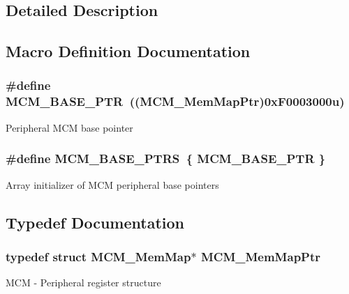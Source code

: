 \subsection{Detailed Description}


\subsection{Macro Definition Documentation}
\hypertarget{group___m_c_m___peripheral_gad41e931f176c230831e3dbad45117841}{}
\subsubsection[{M\+C\+M\+\_\+\+B\+A\+S\+E\+\_\+\+P\+T\+R}]{\setlength{\rightskip}{0pt plus 5cm}\#define M\+C\+M\+\_\+\+B\+A\+S\+E\+\_\+\+P\+T\+R~(({\bf M\+C\+M\+\_\+\+Mem\+Map\+Ptr})0x\+F0003000u)}\label{group___m_c_m___peripheral_gad41e931f176c230831e3dbad45117841}
Peripheral M\+C\+M base pointer \hypertarget{group___m_c_m___peripheral_gae2d5e838ce7d2d4108738c05bf224272}{}
\subsubsection[{M\+C\+M\+\_\+\+B\+A\+S\+E\+\_\+\+P\+T\+R\+S}]{\setlength{\rightskip}{0pt plus 5cm}\#define M\+C\+M\+\_\+\+B\+A\+S\+E\+\_\+\+P\+T\+R\+S~\{ {\bf M\+C\+M\+\_\+\+B\+A\+S\+E\+\_\+\+P\+T\+R} \}}\label{group___m_c_m___peripheral_gae2d5e838ce7d2d4108738c05bf224272}
Array initializer of M\+C\+M peripheral base pointers 

\subsection{Typedef Documentation}
\hypertarget{group___m_c_m___peripheral_ga72e8bbe428d9410917903164d3a5f675}{}
\subsubsection[{M\+C\+M\+\_\+\+Mem\+Map\+Ptr}]{\setlength{\rightskip}{0pt plus 5cm}typedef struct {\bf M\+C\+M\+\_\+\+Mem\+Map}$\ast$ {\bf M\+C\+M\+\_\+\+Mem\+Map\+Ptr}}\label{group___m_c_m___peripheral_ga72e8bbe428d9410917903164d3a5f675}
M\+C\+M -\/ Peripheral register structure 